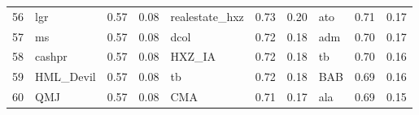 \documentclass[12pt]{article}
\begin{document}
\begin{landscape}
\begin{footnotesize}
\begin{longtable}{l|lcc|lcc|lcc}
			56                    & lgr                         & 0.57                                                                                 & 0.08                            & realestate\_hxz             & 0.73                                                                                 & 0.20                            & ato                         & 0.71                                                                                 & 0.17                           \\
			57                    & ms                          & 0.57                                                                                 & 0.08                            & dcol                        & 0.72                                                                                 & 0.18                            & adm                         & 0.70                                                                                 & 0.17                           \\
			58                    & cashpr                      & 0.57                                                                                 & 0.08                            & HXZ\_IA                     & 0.72                                                                                 & 0.18                            & tb                          & 0.70                                                                                 & 0.16                           \\
			59                    & HML\_Devil                  & 0.57                                                                                 & 0.08                            & tb                          & 0.72                                                                                 & 0.18                            & BAB                         & 0.69                                                                                 & 0.16                           \\
			60                    & QMJ                         & 0.57                                                                                 & 0.08                            & CMA                         & 0.71                                                                                 & 0.17                            & ala                         & 0.69                                                                                 & 0.15                           \\

\end{longtable}
\end{footnotesize}
\end{landscape}
\end{document}
